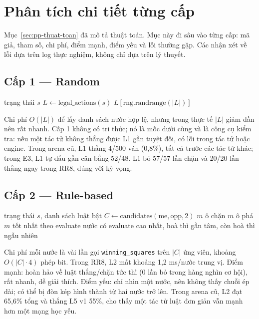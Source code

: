 \section{Phân tích chi tiết từng cấp}
\label{sec:pp-tung-cap}
Mục~\ref{sec:pp-thuat-toan} đã mô tả thuật toán. Mục này đi sâu vào từng cấp: mã giả, tham số,
chi phí, điểm mạnh, điểm yếu và lỗi thường gặp. Các nhận xét về lỗi dựa trên log thực nghiệm,
không chỉ dựa trên lý thuyết.

\subsection{Cấp 1 --- Random}
\begin{algorithm}[H]
  \caption{RandomAgent}
  \begin{algorithmic}[1]
    \REQUIRE trạng thái $s$
    \STATE $L \leftarrow \text{legal\_actions}(s)$
    \RETURN $L[\text{rng.randrange}(|L|)]$
  \end{algorithmic}
\end{algorithm}
Chi phí $O(|L|)$ để lấy danh sách nước hợp lệ, nhưng trong thực tế $|L|$ giảm dần nên rất nhanh.
Cấp 1 không có tri thức; nó là mốc dưới cùng và là công cụ kiểm tra: nếu một tác tử không thắng
được L1 gần tuyệt đối, có lỗi trong tác tử hoặc engine. Trong arena cũ, L1 thắng 4/500 ván
(0,8\%), tất cả trước các tác tử khác; trong E3, L1 tự đấu gần cân bằng 52/48. L1 bỏ 57/57 lần
chặn và 20/20 lần thắng ngay trong RR8, đúng với kỳ vọng.

\subsection{Cấp 2 --- Rule-based}
\begin{algorithm}[H]
  \caption{RuleAgent (P1--P7)}
  \begin{algorithmic}[1]
    \REQUIRE trạng thái $s$, danh sách luật bật
    \STATE $C \leftarrow \text{candidates}(\text{me}, \text{opp}, 2)$
     \RETURN $m$ \ENDIF
     \RETURN ô chặn \ENDIF
     \RETURN $m$ \ENDIF
     \RETURN ô phá \ENDIF
     \RETURN $m$ tốt nhất theo evaluate \ENDIF
    \RETURN nước có evaluate cao nhất, hoà thì gần tâm, còn hoà thì ngẫu nhiên
  \end{algorithmic}
\end{algorithm}
Chi phí mỗi nước là vài lần gọi \texttt{winning\_squares} trên $|C|$ ứng viên, khoảng
$O(|C| \cdot 4)$ phép bit. Trong RR8, L2 mất khoảng 1,2 ms/nước trung vị. Điểm mạnh: hoàn hảo
về luật thắng/chặn tức thì (0 lần bỏ trong hàng nghìn cơ hội), rất nhanh, dễ giải thích. Điểm
yếu: chỉ nhìn một nước, nên không thấy chuỗi ép dài; có thể bị đòn kép hình thành từ hai nước
trở lên. Trong arena cũ, L2 đạt 65,6\% tổng và thắng L5 v1 55\%, cho thấy một tác tử luật đơn
giản vẫn mạnh hơn một mạng học yếu.

